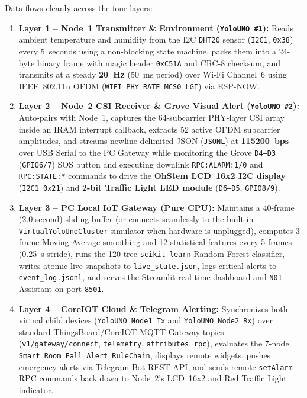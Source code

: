 \documentclass{hcmut-report}
\begin{document}
Data flows cleanly across the four layers:
\begin{enumerate}
  \item \textbf{Layer 1 -- Node~1 Transmitter \& Environment (\texttt{YoloUNO \#1}):} Reads ambient temperature and humidity from the I2C \texttt{DHT20} sensor (\texttt{I2C1}, \texttt{0x38}) every 5~seconds using a non-blocking state machine, packs them into a 24-byte binary frame with magic header \texttt{0xC51A} and CRC-8 checksum, and transmits at a steady \textbf{20~Hz} (50~ms period) over Wi-Fi Channel~6 using IEEE~802.11n OFDM (\texttt{WIFI\_PHY\_RATE\_MCS0\_LGI}) via ESP-NOW.
  \item \textbf{Layer 2 -- Node~2 CSI Receiver \& Grove Visual Alert (\texttt{YoloUNO \#2}):} Auto-pairs with Node~1, captures the 64-subcarrier PHY-layer CSI array inside an IRAM interrupt callback, extracts 52 active OFDM subcarrier amplitudes, and streams newline-delimited JSON (\texttt{JSONL}) at \textbf{115200~bps} over USB Serial to the PC Gateway while monitoring the Grove \texttt{D4--D3} (\texttt{GPIO6/7}) SOS button and executing downlink \texttt{RPC:ALARM:1/0} and \texttt{RPC:STATE:*} commands to drive the \textbf{OhStem LCD~16x2 I2C display} (\texttt{I2C1 0x21}) and \textbf{2-bit Traffic Light LED module} (\texttt{D6--D5}, \texttt{GPIO8/9}).
  \item \textbf{Layer 3 -- PC Local IoT Gateway (Pure CPU):} Maintains a 40-frame (2.0-second) sliding buffer (or connects seamlessly to the built-in \texttt{VirtualYoloUnoCluster} simulator when hardware is unplugged), computes 3-frame Moving Average smoothing and 12 statistical features every 5 frames (0.25~s stride), runs the 120-tree \texttt{scikit-learn} Random Forest classifier, writes atomic live snapshots to \texttt{live\_state.json}, logs critical alerts to \texttt{event\_log.jsonl}, and serves the Streamlit real-time dashboard and \texttt{N01} Assistant on port \texttt{8501}.
  \item \textbf{Layer 4 -- CoreIOT Cloud \& Telegram Alerting:} Synchronizes both virtual child devices (\texttt{YoloUNO\_Node1\_Tx} and \texttt{YoloUNO\_Node2\_Rx}) over standard ThingsBoard/CoreIOT MQTT Gateway topics (\texttt{v1/gateway/connect}, \texttt{telemetry}, \texttt{attributes}, \texttt{rpc}), evaluates the 7-node \texttt{Smart\_Room\_Fall\_Alert\_RuleChain}, displays remote widgets, pushes emergency alerts via Telegram Bot REST API, and sends remote \texttt{setAlarm} RPC commands back down to Node~2's LCD~16x2 and Red Traffic Light indicator.
\end{enumerate}
\end{document}
